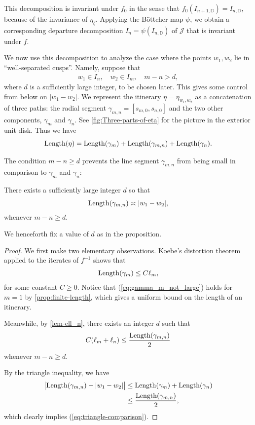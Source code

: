 This decomposition is invariant under $f_0$ in the sense that $f_0(I_{n+1, \mathbb D})=I_{n, \mathbb D}$, because of the invariance of $\eta _\zeta$.
Applying the Böttcher map $\psi$, we obtain a corresponding departure decomposition $I_n = \psi(I_{n, \mathbb D})$ of $\mathcal J$ that is invariant under $f$.

We now use this decomposition to analyze the case where the points $w_1,w_2$ lie in ``well-separated cusps''. Namely, suppose that
\begin{align} \label{parabolic separation}
	w_1 \in I_n, \quad w_2 \in I_m, \quad m-n > d,
\end{align}
where $d$ is a sufficiently large integer, to be chosen later. 
This gives some control from below on $|w_1-w_2|$. 
We represent the itinerary $\eta=\eta_{w_1,w_2}$ as a concatenation of three paths: the radial segment $\gamma_{m,n}=[s_{m,0},s_{n,0}]$ and the two other components, $\gamma _m$ and $\gamma_n$. See \cref{fig:Three-parts-of-eta} for the picture in the exterior unit disk.
Thus we have
\begin{equation}
	\operatorname{Length}(\eta)=\operatorname{Length}(\gamma_m)+\operatorname{Length}(\gamma_{m,n})+\operatorname{Length}(\gamma_n).
\end{equation}



The condition $m-n \geq d$ prevents the line segment $\gamma _{m,n}$ from being small in comparison to $\gamma_m$ and $\gamma_n$:
\begin{proposition}
\label {case-3-proof}
There exists a sufficiently large integer $d$ so that 
	\begin{equation}
	\label{eq:triangle-comparison}
		\operatorname{Length}(\gamma_{m,n}) \asymp |w_1-w_2|,
	\end{equation}
	whenever $m-n \geq d$.
\end{proposition}

We henceforth fix a value of $d$ as in the proposition.
\begin{proof}
We first make two elementary observations. Koebe's distortion theorem applied to the iterates of $f^{-1}$ shows that
\begin{equation} \label{eq:gamma_m_not_large}
		\operatorname{Length}(\gamma_m) \leq C \ell_m,
	\end{equation}
for some constant $C \geq 0$. Notice that (\ref{eq:gamma_m_not_large}) holds for $m=1$ by \cref{prop:finite-length}, which gives a uniform bound on the length of an itinerary.

Meanwhile, by \cref{lem-ell_n}, there exists an integer $d$ such that
\begin{align}
C(\ell_m + \ell _n) \leq \frac{\operatorname{Length}(\gamma_{m,n})}{2}
\end{align}
whenever $m-n \geq d$.

By the triangle inequality, we have
\begin{align*} 
		\bigl | \operatorname{Length}(\gamma_{m,n}) - |w_1-w_2| \bigr | & \le \operatorname{Length}(\gamma_m)+\operatorname{Length}(\gamma_n) \\
		& \le \frac{\operatorname{Length}(\gamma_{m,n})}{2},
\end{align*}
which clearly implies (\ref{eq:triangle-comparison}).
\end{proof}

